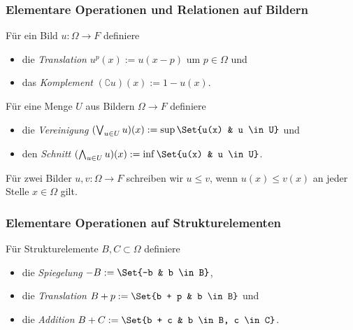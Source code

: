 \documentclass{beamer}
\begin{document}
\begin{frame}
    \frametitle{Elementare Operationen und Relationen auf Bildern}
    \begin{definition}
        Für ein Bild $u: \Omega \to F$ definiere
        \begin{itemize}
            \item \pause
                die \emph{Translation} $u^p(x) := u(x-p)$ um $p \in \Omega$ \pause und
            \item
                das \emph{Komplement} $(\complement u)(x) := 1 - u(x)$.
        \end{itemize}
        \pause
        Für eine Menge $U$ aus Bildern $\Omega \to F$ definiere
        \begin{itemize}
            \item \pause
                die \emph{Vereinigung} $(\bigvee_{u \in U} u)(x) := \sup \Set{u(x) & u \in U}$ \pause und
            \item
                den \emph{Schnitt} $(\bigwedge_{u \in U} u)(x) := \inf \Set{u(x) & u \in U}$.
        \end{itemize}
        \pause
        Für zwei Bilder $u, v: \Omega \to F$ schreiben wir $u \le v$, wenn $u(x) \le v(x)$ an jeder Stelle $x \in \Omega$ gilt.
    \end{definition}
\end{frame}

%

\begin{frame}
    \frametitle{Elementare Operationen auf Strukturelementen}
    \begin{definition}
        Für Strukturelemente $B, C \subset \Omega$ definiere
        \begin{itemize}
            \item \pause
                die \emph{Spiegelung} $-B := \Set{-b & b \in B}$\pause,
            \item
                die \emph{Translation} $B + p := \Set{b + p & b \in B}$ \pause und
            \item
                die \emph{Addition} $B + C := \Set{b + c & b \in B, c \in C}$.
        \end{itemize}
    \end{definition}
\end{frame}
\end{document}
